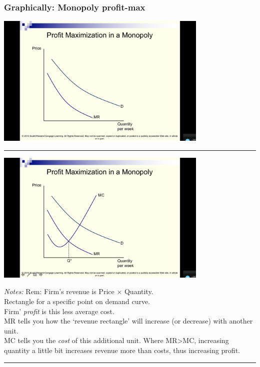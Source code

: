 \documentclass[]{article}
\begin{document}
\hypertarget{graphically-monopoly-profit-max}{%
\subsubsection{Graphically: Monopoly profit-max}\label{graphically-monopoly-profit-max}}

\includegraphics[height=2.5in]{picsfigs/monopprofit1.png}

\begin{center}\rule{0.5\linewidth}{\linethickness}\end{center}

\includegraphics[height=2.5in]{picsfigs/monopprofit2.png}

\emph{Notes:}
Rem: Firm's revenue is Price \(\times\) Quantity.\\
Rectangle for a specific point on demand curve.\\
Firm' \emph{profit} is this less average cost.\\
MR tells you how the `revenue rectangle' will increase (or decrease) with another unit.\\
MC tells you the \emph{cost} of this additional unit.
Where MR\textgreater{}MC, increasing quantity a little bit increases revenue more than costs, thus increasing profit.

\begin{center}\rule{0.5\linewidth}{\linethickness}\end{center}
\end{document}
